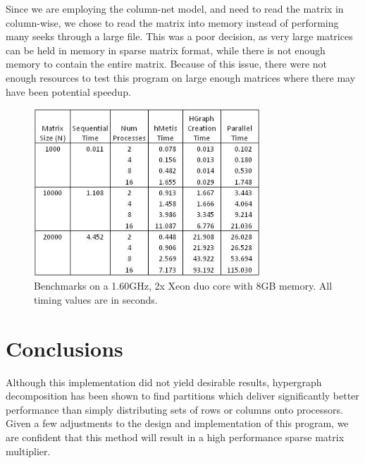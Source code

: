 \documentclass{article}
\begin{document}
Since we are employing the column-net model, and need to read the matrix in column-wise, we chose to read the matrix into memory instead of performing many seeks through a large file. This was a poor decision, as very large matrices can be held in memory in sparse matrix format, while there is not enough memory to contain the entire matrix. Because of this issue, there were not enough resources to test this program on large enough matrices where there may have been potential speedup.

\begin{figure}[htb]
\begin{center}
\mbox{\includegraphics[width=85mm]{results.JPG}}
\end{center}
\caption{Benchmarks on a 1.60GHz, 2x Xeon duo core with 8GB memory. All timing values are in seconds.}
\label{results}
\end{figure}

\section{Conclusions}

Although this implementation did not yield desirable results, hypergraph decomposition has been shown to find partitions which deliver significantly better performance than simply distributing sets of rows or columns onto processors. Given a few adjustments to the design and implementation of this program, we are confident that this method will result in a high performance sparse matrix multiplier.



\end{document}
